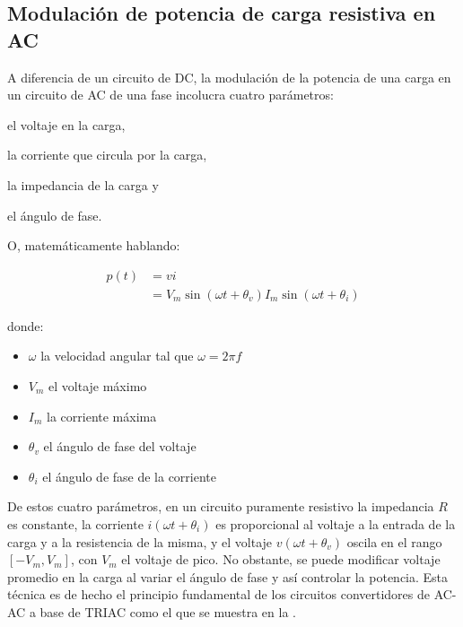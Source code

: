 %
%


\subsection{Modulación de potencia de carga resistiva en AC}%
\label{seq:intro-dimmer}

A diferencia de un circuito de DC, la modulación de la potencia de una carga en un circuito de AC de una fase incolucra cuatro parámetros:
\begin{enumerate*}[label=\roman*\rpar]
	\item el voltaje en la carga,
	\item la corriente que circula por la carga,
	\item la impedancia de la carga
	y
	\item el ángulo de fase.
\end{enumerate*}
O, matemáticamente hablando:

\begin{align}
	p(t) & =vi
	\label{eq:pvi}\\
	  & =
		V_{m}\sin\left(\omega t + \theta_v \right)
		I_{m}\sin\left(\omega t + \theta_i \right)
	\label{eq:pvi-full}
\end{align}

\noindent donde:

\begin{itemize}[noitemsep]
	\item $\omega$ la velocidad angular tal que $\omega = 2 \pi f$
	\item $V_{m}$ el voltaje máximo
	\item $I_{m}$ la corriente máxima
	\item $\theta_v$ el ángulo de fase del voltaje
	\item $\theta_i$ el ángulo de fase de la corriente
\end{itemize}

De estos cuatro parámetros, en un circuito puramente resistivo la impedancia $R$ es constante, la corriente $i(\omega t + \theta_i)$ es proporcional al voltaje a la entrada de la carga y a la resistencia de la misma, y el voltaje $v(\omega t + \theta_v)$ oscila en el rango $\left[-V_m, V_m\right]$, con $V_m$ el voltaje de pico.
No obstante, se puede modificar voltaje promedio en la carga al variar el ángulo de fase y así controlar la potencia.
Esta técnica es de hecho el principio fundamental de los circuitos convertidores de AC-AC a base de TRIAC como el que se muestra en la .

